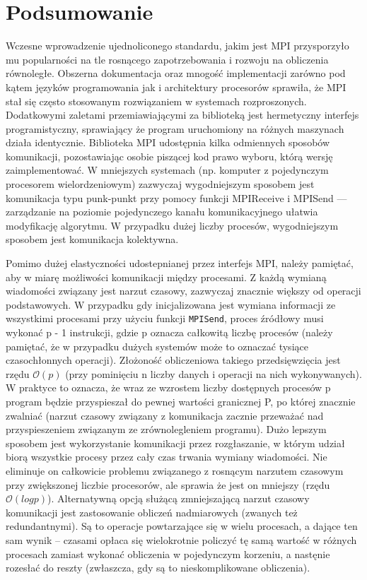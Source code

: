 \section{Podsumowanie}

Wczesne wprowadzenie ujednoliconego standardu, jakim jest MPI przysporzyło mu popularności na tle rosnącego zapotrzebowania i rozwoju na obliczenia równoległe. Obszerna dokumentacja oraz mnogość implementacji zarówno pod kątem języków programowania jak i architektury procesorów sprawiła, że MPI stał się często stosowanym rozwiązaniem w systemach rozproszonych. Dodatkowymi zaletami przemiawiającymi za biblioteką jest hermetyczny interfejs programistyczny, sprawiający że program uruchomiony na różnych maszynach działa identycznie. Biblioteka MPI udostępnia kilka odmiennych sposobów komunikacji, pozostawiając osobie piszącej kod prawo wyboru, którą wersję zaimplementować. W mniejszych systemach (np. komputer z pojedynczym procesorem wielordzeniowym) zazwyczaj wygodniejszym sposobem jest komunikacja typu punk-punkt przy pomocy funkcji MPI\textunderscore Receive i MPI\textunderscore Send --- zarządzanie na poziomie pojedynczego kanału komunikacyjnego ułatwia modyfikację algorytmu. W przypadku dużej liczby procesów, wygodniejszym sposobem jest komunikacja kolektywna.

Pomimo dużej elastyczności udostepnianej przez interfejs MPI, należy pamiętać, aby w miarę możliwości komunikacji między procesami. Z każdą wymianą wiadomości związany jest narzut czasowy, zazwyczaj znacznie większy od operacji podstawowych. W przypadku gdy inicjalizowana jest wymiana informacji ze wszystkimi procesami przy użyciu funkcji \texttt{MPI\textunderscore Send}, proces źródłowy musi wykonać p - 1 instrukcji, gdzie p oznacza całkowitą liczbę procesów (należy pamiętać, że w przypadku dużych systemów może to oznaczać tysiące czasochłonnych operacji). Złożoność obliczeniowa takiego przedsięwzięcia jest rzędu $\mathcal{O}(p)$ (przy pominięciu n liczby danych i operacji na nich wykonywanych). W praktyce to oznacza, że wraz ze wzrostem liczby dostępnych procesów p program będzie przyspieszał do pewnej wartości granicznej P, po której znacznie zwalniać (narzut czasowy związany z komunikacja zacznie przeważać nad przyspieszeniem związanym ze zrównolegleniem programu). Dużo lepszym sposobem jest wykorzystanie komunikacji przez rozgłaszanie, w którym udział biorą wszystkie procesy przez cały czas trwania wymiany wiadomości. Nie eliminuje on całkowicie problemu związanego z rosnącym narzutem czasowym przy zwiększonej liczbie procesorów, ale sprawia że jest on mniejszy (rzędu $\mathcal{O}(logp)$). Alternatywną opcją służącą zmniejszającą narzut czasowy komunikacji jest zastosowanie obliczeń nadmiarowych (zwanych też redundantnymi). Są to operacje powtarzające się w wielu procesach, a dające ten sam wynik -- czasami opłaca się wielokrotnie policzyć tę samą wartość w różnych procesach zamiast wykonać obliczenia w pojedynczym korzeniu, a nastęnie rozesłać do reszty (zwłaszcza, gdy są to nieskomplikowane obliczenia). 